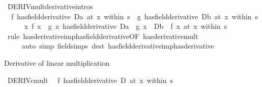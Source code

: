 \begin{isabellebody}
\endisatagproof
{\isafoldproof}%
%
\isadelimproof
\isanewline
%
\endisadelimproof
\isanewline
{}\isamarkupfalse%
\ DERIV{\isacharunderscore}{\kern0pt}mult{\isacharbrackleft}{\kern0pt}derivative{\isacharunderscore}{\kern0pt}intros{\isacharbrackright}{\kern0pt}{\isacharcolon}{\kern0pt}\isanewline
\ \ {\isachardoublequoteopen}{\isacharparenleft}{\kern0pt}f\ has{\isacharunderscore}{\kern0pt}field{\isacharunderscore}{\kern0pt}derivative\ Da{\isacharparenright}{\kern0pt}\ {\isacharparenleft}{\kern0pt}at\ x\ within\ s{\isacharparenright}{\kern0pt}\ {\isasymLongrightarrow}\ {\isacharparenleft}{\kern0pt}g\ has{\isacharunderscore}{\kern0pt}field{\isacharunderscore}{\kern0pt}derivative\ Db{\isacharparenright}{\kern0pt}\ {\isacharparenleft}{\kern0pt}at\ x\ within\ s{\isacharparenright}{\kern0pt}\ {\isasymLongrightarrow}\isanewline
\ \ \ \ {\isacharparenleft}{\kern0pt}{\isacharparenleft}{\kern0pt}{\isasymlambda}x{\isachardot}{\kern0pt}\ f\ x\ {\isacharasterisk}{\kern0pt}\ g\ x{\isacharparenright}{\kern0pt}\ has{\isacharunderscore}{\kern0pt}field{\isacharunderscore}{\kern0pt}derivative\ Da\ {\isacharasterisk}{\kern0pt}\ g\ x\ {\isacharplus}{\kern0pt}\ Db\ {\isacharasterisk}{\kern0pt}\ f\ x{\isacharparenright}{\kern0pt}\ {\isacharparenleft}{\kern0pt}at\ x\ within\ s{\isacharparenright}{\kern0pt}{\isachardoublequoteclose}\isanewline
%
\isadelimproof
\ \ %
\endisadelimproof
%
\isatagproof
{}\isamarkupfalse%
\ {\isacharparenleft}{\kern0pt}rule\ has{\isacharunderscore}{\kern0pt}derivative{\isacharunderscore}{\kern0pt}imp{\isacharunderscore}{\kern0pt}has{\isacharunderscore}{\kern0pt}field{\isacharunderscore}{\kern0pt}derivative{\isacharbrackleft}{\kern0pt}OF\ has{\isacharunderscore}{\kern0pt}derivative{\isacharunderscore}{\kern0pt}mult{\isacharbrackright}{\kern0pt}{\isacharparenright}{\kern0pt}\isanewline
\ \ \ \ \ {\isacharparenleft}{\kern0pt}auto\ simp{\isacharcolon}{\kern0pt}\ field{\isacharunderscore}{\kern0pt}simps\ dest{\isacharcolon}{\kern0pt}\ has{\isacharunderscore}{\kern0pt}field{\isacharunderscore}{\kern0pt}derivative{\isacharunderscore}{\kern0pt}imp{\isacharunderscore}{\kern0pt}has{\isacharunderscore}{\kern0pt}derivative{\isacharparenright}{\kern0pt}%
\endisatagproof
{\isafoldproof}%
%
\isadelimproof
%
\endisadelimproof
%
\begin{isamarkuptext}%
Derivative of linear multiplication%
\end{isamarkuptext}\isamarkuptrue%
\isamarkupfalse%
\ DERIV{\isacharunderscore}{\kern0pt}cmult{\isacharcolon}{\kern0pt}\isanewline
\ \ {\isachardoublequoteopen}{\isacharparenleft}{\kern0pt}f\ has{\isacharunderscore}{\kern0pt}field{\isacharunderscore}{\kern0pt}derivative\ D{\isacharparenright}{\kern0pt}\ {\isacharparenleft}{\kern0pt}at\ x\ within\ s{\isacharparenright}{\kern0pt}\ {\isasymLongrightarrow}\isanewline

\end{isabellebody}
